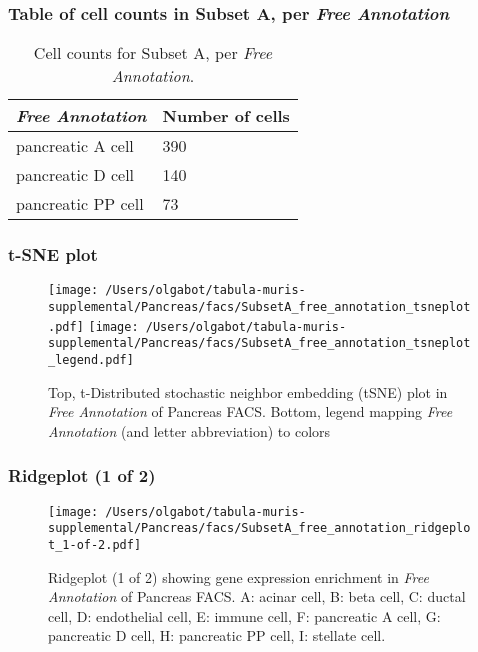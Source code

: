 \subsubsection{Table of cell counts in Subset A, per \emph{Free Annotation}}\begin{table}[h]
\centering
\label{my-label}
\begin{tabular}{@{}ll@{}}
\toprule

\emph{Free Annotation}& Number of cells \\ \midrule
pancreatic A cell & 390 \\

pancreatic D cell & 140 \\

pancreatic PP cell & 73 \\
\bottomrule
\end{tabular}
\caption{Cell counts for Subset A, per \emph{Free Annotation}.}
\end{table}

\clearpage
\subsubsection{t-SNE plot}
\begin{figure}[h]
\centering
\texttt{[image: /Users/olgabot/tabula-muris-supplemental/Pancreas/facs/SubsetA\_free\_annotation\_tsneplot.pdf]}
\texttt{[image: /Users/olgabot/tabula-muris-supplemental/Pancreas/facs/SubsetA\_free\_annotation\_tsneplot\_legend.pdf]}
\caption{Top, t-Distributed stochastic neighbor embedding (tSNE) plot  in \emph{Free Annotation} of Pancreas FACS. Bottom, legend mapping \emph{Free Annotation} (and letter abbreviation) to colors}
\end{figure}


\clearpage

\subsubsection{Ridgeplot (1 of 2)}
\begin{figure}[h]
\centering
\texttt{[image: /Users/olgabot/tabula-muris-supplemental/Pancreas/facs/SubsetA\_free\_annotation\_ridgeplot\_1-of-2.pdf]}

\caption{ Ridgeplot (1 of 2)  showing gene expression enrichment in \emph{Free Annotation} of Pancreas FACS. A: acinar cell, B: beta cell, C: ductal cell, D: endothelial cell, E: immune cell, F: pancreatic A cell, G: pancreatic D cell, H: pancreatic PP cell, I: stellate cell.}
\end{figure}


